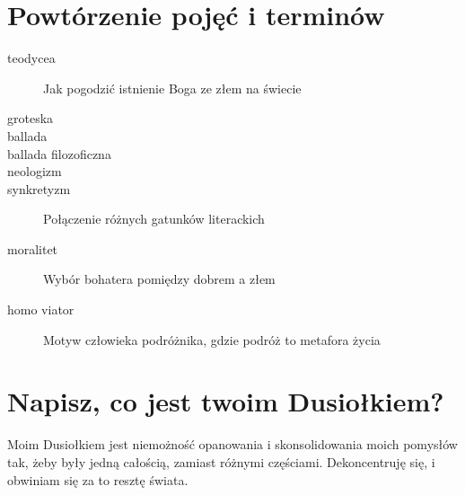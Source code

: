 \documentclass{article}
\begin{document}
\section{Powtórzenie pojęć i terminów}
\begin{description}
    \item[teodycea] Jak pogodzić istnienie Boga ze złem na świecie
    \item[groteska] 
    \item[ballada] 
    \item[ballada filozoficzna] 
    \item[neologizm] 
    \item[synkretyzm] Połączenie różnych gatunków literackich
    \item[moralitet] Wybór bohatera pomiędzy dobrem a złem
    \item[homo viator] Motyw człowieka podróżnika, gdzie podróż to metafora życia
\end{description}
\section{Napisz, co jest twoim Dusiołkiem?}
Moim Dusiołkiem jest niemożność opanowania i skonsolidowania moich pomysłów tak, żeby były jedną całością, zamiast różnymi częściami. Dekoncentruję się, i obwiniam się za to resztę świata.
\end{document}
